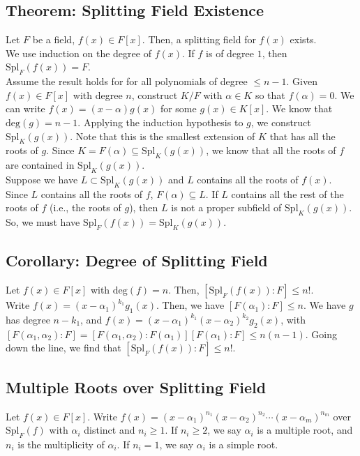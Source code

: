 \documentclass[10pt]{extarticle}
\begin{document}
  \subsection{Theorem: Splitting Field Existence}%
  Let $F$ be a field, $f(x)\in F[x]$. Then, a splitting field for $f(x)$ exists.\\

  We use induction on the degree of $f(x)$. If $f$ is of degree $1$, then $\text{Spl}_{F}(f(x)) = F$.\\

  Assume the result holds for for all polynomials of degree $\leq n-1$. Given $f(x)\in F[x]$ with degree $n$, construct $K/F$ with $\alpha \in K$ so that $f(\alpha) = 0$. We can write $f(x) = (x-\alpha)g(x)$ for some $g(x) \in K[x]$. We know that $\text{deg}(g) = n-1$. Applying the induction hypothesis to $g$, we construct $\text{Spl}_{K}(g(x))$. Note that this is the smallest extension of $K$ that has all the roots of $g$. Since $K = F(\alpha)\subseteq \text{Spl}_{K}(g(x))$, we know that all the roots of $f$ are contained in $\text{Spl}_{K}(g(x))$.\\

  Suppose we have $L\subset \text{Spl}_{K}(g(x))$ and $L$ contains all the roots of $f(x)$. Since $L$ contains all the roots of $f$, $F(\alpha)\subseteq L$. If $L$ contains all the rest of the roots of $f$ (i.e., the roots of $g$), then $L$ is not a proper subfield of $\text{Spl}_{K}(g(x))$. So, we must have $\text{Spl}_{F}(f(x)) = \text{Spl}_{K}(g(x))$.
  \subsection{Corollary: Degree of Splitting Field}%
  Let $f(x) \in F[x]$ with $\text{deg}(f) = n$. Then, $[\text{Spl}_{F}(f(x)):F] \leq n!$.\\

  Write $f(x) = (x-\alpha_1)^{k_1}g_1(x)$. Then, we have $[F(\alpha_1):F]\leq n$. We have $g$ has degree $n-k_1$, and $f(x) = (x-\alpha_1)^{k_1}(x-\alpha_2)^{k_2}g_2(x)$, with $[F(\alpha_1,\alpha_2):F]=[F(\alpha_1,\alpha_2):F(\alpha_1)][F(\alpha_1):F] \leq n(n-1)$. Going down the line, we find that $[\text{Spl}_{F}(f(x)):F] \leq n!$.
  \subsection{Multiple Roots over Splitting Field}%
  Let $f(x) \in F[x]$. Write $f(x) = (x-\alpha_1)^{n_1}(x-\alpha_2)^{n_2}\cdots (x-\alpha_m)^{n_m}$ over $\text{Spl}_{F}(f)$ with $\alpha_i$ distinct and $n_i\geq 1$. If $n_i\geq 2$, we say $\alpha_i$ is a multiple root, and $n_i$ is the multiplicity of $\alpha_i$. If $n_i = 1$, we say $\alpha_i$ is a simple root.\\
\end{document}
